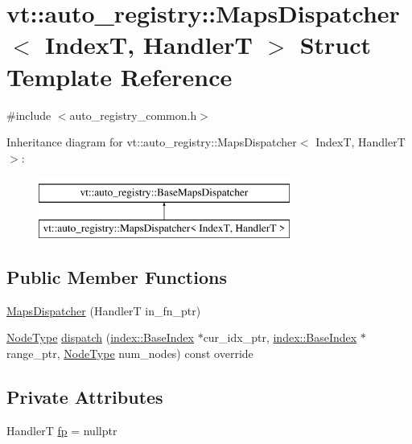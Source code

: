\hypertarget{structvt_1_1auto__registry_1_1_maps_dispatcher}{}\section{vt\+:\+:auto\+\_\+registry\+:\+:Maps\+Dispatcher$<$ IndexT, HandlerT $>$ Struct Template Reference}
\label{structvt_1_1auto__registry_1_1_maps_dispatcher}


{\ttfamily \#include $<$auto\+\_\+registry\+\_\+common.\+h$>$}

Inheritance diagram for vt\+:\+:auto\+\_\+registry\+:\+:Maps\+Dispatcher$<$ IndexT, HandlerT $>$\+:\begin{figure}[H]
\begin{center}
\leavevmode
\includegraphics[height=2.000000cm]{structvt_1_1auto__registry_1_1_maps_dispatcher}
\end{center}
\end{figure}
\subsection*{Public Member Functions}
\begin{DoxyCompactItemize}
\item 
\hyperlink{structvt_1_1auto__registry_1_1_maps_dispatcher_a0b5b1f1c83950b157b243e5e095261b3}{Maps\+Dispatcher} (HandlerT in\+\_\+fn\+\_\+ptr)
\item 
\hyperlink{namespacevt_a866da9d0efc19c0a1ce79e9e492f47e2}{Node\+Type} \hyperlink{structvt_1_1auto__registry_1_1_maps_dispatcher_ac4fa2a94e5f3969bf09a7402c4469f0c}{dispatch} (\hyperlink{structvt_1_1index_1_1_base_index}{index\+::\+Base\+Index} $\ast$cur\+\_\+idx\+\_\+ptr, \hyperlink{structvt_1_1index_1_1_base_index}{index\+::\+Base\+Index} $\ast$range\+\_\+ptr, \hyperlink{namespacevt_a866da9d0efc19c0a1ce79e9e492f47e2}{Node\+Type} num\+\_\+nodes) const override
\end{DoxyCompactItemize}
\subsection*{Private Attributes}
\begin{DoxyCompactItemize}
\item 
HandlerT \hyperlink{structvt_1_1auto__registry_1_1_maps_dispatcher_a419a0598544b3d7430443ba4a2f6470e}{fp} = nullptr
\end{DoxyCompactItemize}


